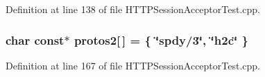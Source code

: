 Definition at line 138 of file H\+T\+T\+P\+Session\+Acceptor\+Test.\+cpp.

\subsubsection[{protos2}]{\setlength{\rightskip}{0pt plus 5cm}char const$\ast$ protos2[$\,$] = \{ \char`\"{}spdy/3\char`\"{}, \char`\"{}h2c\char`\"{} \}}\label{HTTPSessionAcceptorTest_8cpp_abcaf92cd41f2b96f0a6130b267ee0759}


Definition at line 167 of file H\+T\+T\+P\+Session\+Acceptor\+Test.\+cpp.

